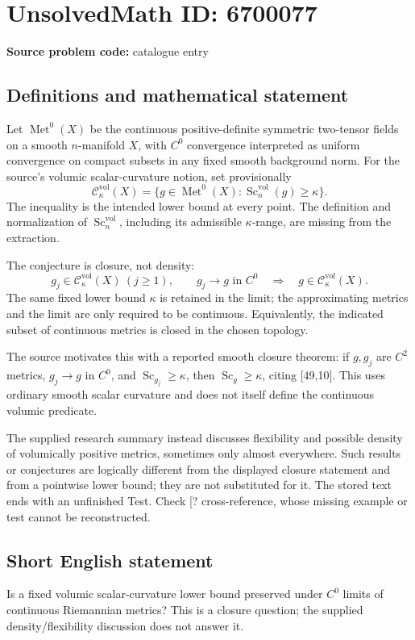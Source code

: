 \documentclass[11pt]{article}
\begin{document}
\section*{UnsolvedMath ID: 6700077}
\textbf{Source problem code:} catalogue entry
\subsection{Definitions and mathematical statement}
Let \(\operatorname{Met}^0(X)\) be the continuous positive-definite symmetric two-tensor fields on a smooth \(n\)-manifold \(X\), with \(C^0\) convergence interpreted as uniform convergence on compact subsets in any fixed smooth background norm. For the source's volumic scalar-curvature notion, set provisionally
\[
\mathcal C^{\mathrm{vol}}_\kappa(X)=
\{g\in\operatorname{Met}^0(X):\operatorname{Sc}^{\mathrm{vol}}_n(g)\ge\kappa\}.
\]
The inequality is the intended lower bound at every point. The definition and normalization of \(\operatorname{Sc}^{\mathrm{vol}}_n\), including its admissible \(\kappa\)-range, are missing from the extraction.

The conjecture is closure, not density:
\[
g_j\in\mathcal C^{\mathrm{vol}}_\kappa(X)\ (j\ge1),\qquad
 g_j\longrightarrow g\text{ in }C^0
\quad\Longrightarrow\quad
 g\in\mathcal C^{\mathrm{vol}}_\kappa(X).
\]
The same fixed lower bound \(\kappa\) is retained in the limit; the approximating metrics and the limit are only required to be continuous. Equivalently, the indicated subset of continuous metrics is closed in the chosen topology.

The source motivates this with a reported smooth closure theorem: if \(g,g_j\) are \(C^2\) metrics, \(g_j\to g\) in \(C^0\), and \(\operatorname{Sc}_{g_j}\ge\kappa\), then \(\operatorname{Sc}_g\ge\kappa\), citing [49,10]. This uses ordinary smooth scalar curvature and does not itself define the continuous volumic predicate.

The supplied research summary instead discusses flexibility and possible density of volumically positive metrics, sometimes only almost everywhere. Such results or conjectures are logically different from the displayed closure statement and from a pointwise lower bound; they are not substituted for it. The stored text ends with an unfinished Test. Check [? cross-reference, whose missing example or test cannot be reconstructed.
\subsection{Short English statement}
Is a fixed volumic scalar-curvature lower bound preserved under \(C^0\) limits of continuous Riemannian metrics? This is a closure question; the supplied density/flexibility discussion does not answer it.
\end{document}
